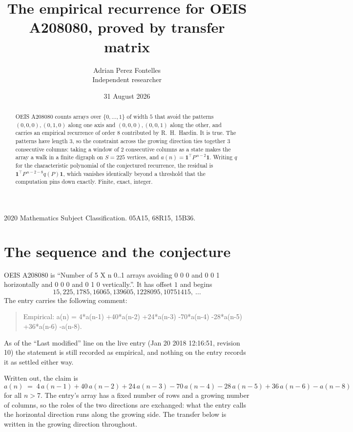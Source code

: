 \documentclass[11pt,a4paper]{article}
\title{The empirical recurrence for OEIS A208080, proved by transfer matrix}
\author{Adrian Perez Fontelles\\ \small Independent researcher}
\date{31 August 2026}
\theoremstyle{plain}
\theoremstyle{definition}
\begin{document}
\maketitle

\begin{abstract}
OEIS A208080 counts arrays over $\{0,\dots,1\}$ of width $5$ that avoid the patterns
$(0,0,0), (0,1,0)$ along one axis and $(0,0,0), (0,0,1)$ along the other, and carries an empirical recurrence of
order $8$ contributed by R.~H.~Hardin. It is true. The patterns have length $3$, so
the constraint across the growing direction ties together $3$ consecutive columns: taking a
window of $2$ consecutive columns as a state makes the array a walk in a finite digraph
on $S=225$ vertices, and $a(n)=\mathbf{1}^{\!\top}P^{\,n-2}\mathbf{1}$. Writing $q$
for the characteristic polynomial of the conjectured recurrence, the residual is
$\mathbf{1}^{\!\top}P^{\,n-2-8}q(P)\mathbf{1}$, which vanishes identically
beyond a threshold that the computation pins down exactly. Finite, exact, integer.
\end{abstract}

\noindent\small 2020 Mathematics Subject Classification. 05A15, 68R15, 15B36.\normalsize

\section{The sequence and the conjecture}

OEIS A208080 is ``Number of 5 X n 0..1 arrays avoiding 0 0 0 and 0 0 1 horizontally and 0 0 0 and 0 1 0 vertically.''. It has offset
$1$ and begins
\[
15, 225, 1785, 16065, 139605, 1228095, 10751415,\ \dots
\]
The entry carries the following comment:
\begin{quote}\small
Empirical: a(n) = 4*a(n-1) +40*a(n-2) +24*a(n-3) -70*a(n-4) -28*a(n-5) +36*a(n-6) -a(n-8).
\end{quote}
As of the ``Last modified'' line on the live entry (Jan 20 2018 12:16:51, revision
10) the statement is still recorded as empirical, and nothing on the entry
records it as settled either way.

Written out, the claim is
\begin{equation}\label{eq:conj}
a(n)\;=\;4\,a(n-1) + 40\,a(n-2) + 24\,a(n-3) - 70\,a(n-4) - 28\,a(n-5) + 36\,a(n-6) - a(n-8)
\end{equation}
for all $n>7$. The entry's array has a fixed number of rows and a growing number of
columns, so the roles of the two directions are exchanged: what the entry calls the
horizontal direction runs along the growing side. The transfer below is written in the
growing direction throughout.
\end{document}
